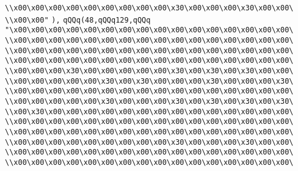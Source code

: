 \verb|\\x00\x00\x00\x00\x00\x00\x00\x00\x00\x30\x00\x00\x00\x30\x00\x00\|\newline
\verb|\\x00\x00"|\newline
\verb|),|\newline
\verb|qQQq(48,qQQq129,qQQq|\newline
\verb|"\x00\x00\x00\x00\x00\x00\x00\x00\x00\x00\x00\x00\x00\x00\x00\x00\|\newline
\verb|\\x00\x00\x00\x00\x00\x00\x00\x00\x00\x00\x00\x00\x00\x00\x00\x00\|\newline
\verb|\\x00\x00\x00\x00\x00\x00\x00\x00\x00\x00\x00\x00\x00\x00\x00\x00\|\newline
\verb|\\x00\x00\x00\x00\x00\x00\x00\x00\x00\x00\x00\x00\x00\x00\x00\x00\|\newline
\verb|\\x00\x00\x00\x30\x00\x00\x00\x00\x00\x30\x00\x30\x00\x30\x00\x00\|\newline
\verb|\\x00\x00\x00\x00\x00\x30\x00\x30\x00\x00\x00\x30\x00\x00\x00\x30\|\newline
\verb|\\x00\x00\x00\x00\x00\x00\x00\x00\x00\x00\x00\x00\x00\x00\x00\x00\|\newline
\verb|\\x00\x00\x00\x00\x00\x30\x00\x00\x00\x30\x00\x30\x00\x30\x00\x30\|\newline
\verb|\\x00\x30\x00\x00\x00\x00\x00\x00\x00\x00\x00\x00\x00\x00\x00\x00\|\newline
\verb|\\x00\x00\x00\x00\x00\x00\x00\x00\x00\x00\x00\x00\x00\x00\x00\x00\|\newline
\verb|\\x00\x00\x00\x00\x00\x00\x00\x00\x00\x00\x00\x00\x00\x00\x00\x00\|\newline
\verb|\\x00\x00\x00\x00\x00\x00\x00\x00\x00\x30\x00\x00\x00\x30\x00\x00\|\newline
\verb|\\x00\x00\x00\x00\x00\x00\x00\x00\x00\x00\x00\x00\x00\x00\x00\x00\|\newline
\verb|\\x00\x00\x00\x00\x00\x00\x00\x00\x00\x00\x00\x00\x00\x00\x00\x00\|\newline

